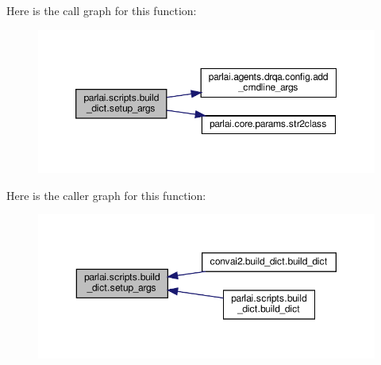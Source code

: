 Here is the call graph for this function\+:
\nopagebreak
\begin{figure}[H]
\begin{center}
\leavevmode
\includegraphics[width=350pt]{namespaceparlai_1_1scripts_1_1build__dict_a01e78707ace903aa772ada53fafe7067_cgraph}
\end{center}
\end{figure}
Here is the caller graph for this function\+:
\nopagebreak
\begin{figure}[H]
\begin{center}
\leavevmode
\includegraphics[width=350pt]{namespaceparlai_1_1scripts_1_1build__dict_a01e78707ace903aa772ada53fafe7067_icgraph}
\end{center}
\end{figure}
